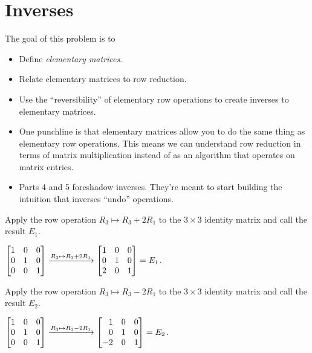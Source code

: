 	\bookonlynewpage
\section*{Inverses}

	\question
	\begin{annotation}
		\begin{goals}

			The goal of this problem is to
			\begin{itemize}
				\item Define \emph{elementary matrices}.
				\item Relate elementary matrices to row reduction.
				\item Use the ``reversibility'' of elementary row
					operations to create inverses to elementary matrices.
			\end{itemize}
		\end{goals}

		\begin{notes}
			\begin{itemize}
				\item One punchline is that elementary matrices
					allow you to do the same thing as elementary row
					operations. This means we can understand row
					reduction in terms of matrix multiplication instead
					of as an algorithm that operates on matrix entries.
				\item Parts 4 and 5 foreshadow inverses. They're meant to start
					building the intuition that inverses ``undo'' operations.
			\end{itemize}
		\end{notes}
	\end{annotation}
	\begin{parts}
		\item Apply the row operation $R_3\mapsto R_3+2R_1$ to the $3\times 3$ identity
		matrix and call the result $E_1$.
			\begin{solution}
				$\mat{1&0&0\\0&1&0\\0&0&1} \xrightarrow{R_3\mapsto R_3+2R_1} \mat{1&0&0\\0&1&0\\2&0&1}=E_1$.
			\end{solution}
		\item Apply the row operation $R_3\mapsto R_3-2R_1$ to the $3\times 3$ identity
		matrix and call the result $E_2$.
			\begin{solution}
				$\mat{1&0&0\\0&1&0\\0&0&1} \xrightarrow{R_3\mapsto R_3-2R_1} \mat{1&0&0\\0&1&0\\-2&0&1}=E_2$.
			\end{solution}
	\end{parts}

